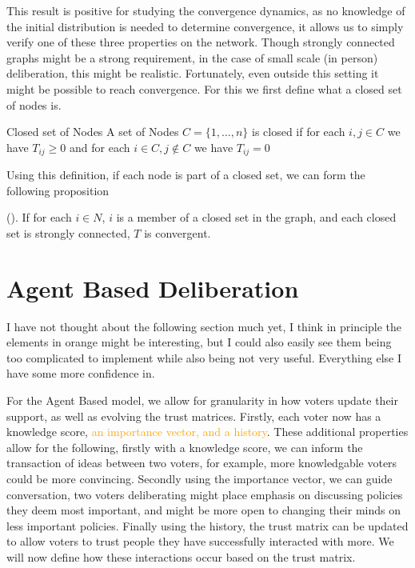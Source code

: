 This result is positive for studying the convergence dynamics, as no knowledge of the initial distribution is needed to determine convergence, it allows us to simply verify one of these three properties on the network. Though strongly connected graphs might be a strong requirement, in the case of small scale (in person) deliberation, this might be realistic. Fortunately, even outside this setting it might be possible to reach convergence. For this we first define what a closed set of nodes is.

\begin{definition}{Closed set of Nodes}{}
	A set of Nodes \(C = \{1, \dots, n\}\) is closed if for each \(i,j \in C\) we have $T_{ij} \geq 0$ and for each \(i \in C, j \notin C\) we have \(T_{ij} = 0\)
\end{definition}

Using this definition, if each node is part of a closed set, we can form the following proposition

\begin{proposition}{(\citet{golubNaiveLearningSocial2010}).}
	If for each \(i \in N\), \(i\) is a member of a closed set in the graph, and each closed set is strongly connected, \(T\) is convergent.
\end{proposition}

\section{Agent Based Deliberation}
\textcolor{RedViolet}{I have not thought about the following section much yet, I think in principle the elements in orange might be interesting, but I could also easily see them being too complicated to implement while also being not very useful. Everything else I have some more confidence in.}

For the Agent Based model, we allow for granularity in how voters update their support, as well as evolving the trust matrices. Firstly, each voter now has a knowledge score, \textcolor{orange}{an importance vector, and a history}. These additional properties allow for the following, firstly with a knowledge score, we can inform the transaction of ideas between two voters, for example, more knowledgable voters could be more convincing. Secondly using the importance vector, we can guide conversation, two voters deliberating might place emphasis on discussing policies they deem most important, and might be more open to changing their minds on less important policies. Finally using the history, the trust matrix can be updated to allow voters to trust people they have successfully interacted with more. We will now define how these interactions occur based on the trust matrix.


